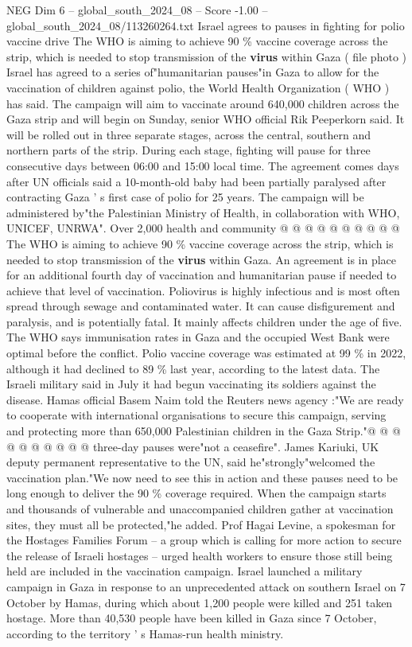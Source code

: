 \begin{textsample}{NEG Dim 6 – global\_south\_2024\_08 – Score -1.00 – global\_south\_2024\_08/113260264.txt}  \label{ex:f6_neg_057}
Israel agrees to pauses in fighting for polio vaccine drive The WHO is aiming to achieve 90 \% vaccine coverage across the strip, which is needed to stop transmission of the \textbf{virus} within Gaza ( file photo ) Israel has agreed to a series of"humanitarian pauses"in Gaza to allow for the vaccination of children against polio, the World Health Organization ( WHO ) has said.
The campaign will aim to vaccinate around 640,000 children across the Gaza strip and will begin on Sunday, senior WHO official Rik Peeperkorn said.
It will be rolled out in three separate stages, across the central, southern and northern parts of the strip.
During each stage, fighting will pause for three consecutive days between 06:00 and 15:00 local time.
The agreement comes days after UN officials said a 10-month-old baby had been partially paralysed after contracting Gaza ' s first case of polio for 25 years.
The campaign will be administered by"the Palestinian Ministry of Health, in collaboration with WHO, UNICEF, UNRWA".
Over 2,000 health and community @ @ @ @ @ @ @ @ @ @ The WHO is aiming to achieve 90 \% vaccine coverage across the strip, which is needed to stop transmission of the \textbf{virus} within Gaza.
An agreement is in place for an additional fourth day of vaccination and humanitarian pause if needed to achieve that level of vaccination.
Poliovirus is highly infectious and is most often spread through sewage and contaminated water.
It can cause disfigurement and paralysis, and is potentially fatal.
It mainly affects children under the age of five.
The WHO says immunisation rates in Gaza and the occupied West Bank were optimal before the conflict.
Polio vaccine coverage was estimated at 99 \% in 2022, although it had declined to 89 \% last year, according to the latest data.
The Israeli military said in July it had begun vaccinating its soldiers against the disease.
Hamas official Basem Naim told the Reuters news agency :"We are ready to cooperate with international organisations to secure this campaign, serving and protecting more than 650,000 Palestinian children in the Gaza Strip."@ @ @ @ @ @ @ @ @ @ three-day pauses were"not a ceasefire".
James Kariuki, UK deputy permanent representative to the UN, said he"strongly"welcomed the vaccination plan."We now need to see this in action and these pauses need to be long enough to deliver the 90 \% coverage required.
When the campaign starts and thousands of vulnerable and unaccompanied children gather at vaccination sites, they must all be protected,"he added.
Prof Hagai Levine, a spokesman for the Hostages Families Forum -- a group which is calling for more action to secure the release of Israeli hostages -- urged health workers to ensure those still being held are included in the vaccination campaign.
Israel launched a military campaign in Gaza in response to an unprecedented attack on southern Israel on 7 October by Hamas, during which about 1,200 people were killed and 251 taken hostage.
More than 40,530 people have been killed in Gaza since 7 October, according to the territory ' s Hamas-run health ministry.

\end{textsample}
